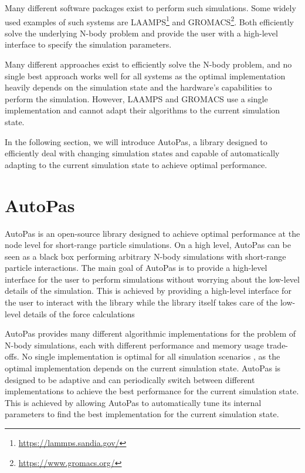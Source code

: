 Many different software packages exist to perform such simulations. Some widely used examples of such systems are LAAMPS\footnote{\url{https://lammps.sandia.gov/}} and GROMACS\footnote{\url{https://www.gromacs.org/}}. Both efficiently solve the underlying N-body problem and provide the user with a high-level interface to specify the simulation parameters.

Many different approaches exist to efficiently solve the N-body problem, and no single best approach works well for all systems as the optimal implementation heavily depends on the simulation state and the hardware's capabilities to perform the simulation. However, LAAMPS and GROMACS use a single implementation and cannot adapt their algorithms to the current simulation state.

In the following section, we will introduce AutoPas, a library designed to efficiently deal with changing simulation states and capable of automatically adapting to the current simulation state to achieve optimal performance.

\section{AutoPas}

AutoPas is an open-source library designed to achieve optimal performance at the node level for short-range particle simulations. On a high level, AutoPas can be seen as a black box performing arbitrary N-body simulations with short-range particle interactions. The main goal of AutoPas is to provide a high-level interface for the user to perform simulations without worrying about the low-level details of the simulation. This is achieved by providing a high-level interface for the user to interact with the library while the library itself takes care of the low-level details of the force calculations

AutoPas provides many different algorithmic implementations for the problem of N-body simulations, each with different performance and memory usage trade-offs. No single implementation is optimal for all simulation scenarios , as the optimal implementation depends on the current simulation state.
AutoPas is designed to be adaptive and can periodically switch between different implementations to achieve the best performance for the current simulation state. This is achieved by allowing AutoPas to automatically tune its internal parameters to find the best implementation for the current simulation state.


